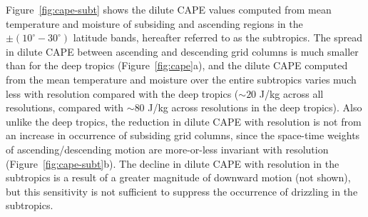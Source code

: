 \documentclass[times]{qjrms4}
\begin{document}
Figure~\ref{fig:cape-subt} shows the dilute CAPE values computed from mean temperature and moisture of subsiding and ascending regions in the $\pm \left( 10^{\circ}-30^{\circ} \right)$ latitude bands, hereafter referred to as the subtropics. The spread in dilute CAPE between ascending and descending grid columns is much smaller than for the deep tropics (Figure~\ref{fig:cape}a), and the dilute CAPE computed from the mean temperature and moisture over the entire subtropics varies much less with resolution compared with the deep tropics ($\sim 20$ J/kg across all resolutions, compared with $\sim 80$ J/kg across resolutions in the deep tropics). Also unlike the deep tropics, the reduction in dilute CAPE with resolution is not from an increase in occurrence of subsiding grid columns, since the space-time weights of ascending/descending motion are more-or-less invariant with resolution (Figure~\ref{fig:cape-subt}b). The decline in dilute CAPE with resolution in the subtropics is a result of a greater magnitude of downward motion (not shown), but this sensitivity is not sufficient to suppress the occurrence of drizzling in the subtropics.
\end{document}
